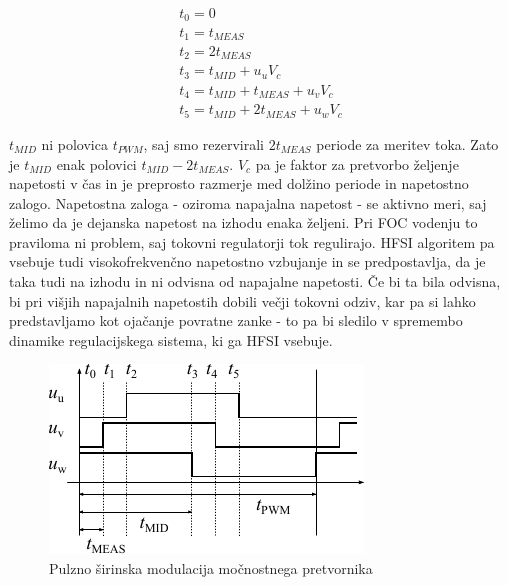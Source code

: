 \documentclass[a4paper,twoside,openright,12pt,slovene]{book}
\begin{document}
\begin{equation} \label{izracunPWM}
\begin{gathered}
    t_0 = 0  \\
    t_1 = t_{MEAS}  \\
    t_2 = 2t_{MEAS}  \\
    t_3 = t_{MID} + u_uV_c  \\
    t_4 = t_{MID} + t_{MEAS} + u_vV_c \\
    t_5 = t_{MID} + 2t_{MEAS} + u_wV_c
\end{gathered}
\end{equation}

$t_{MID}$ ni polovica $t_{PWM}$, saj smo rezervirali $2t_{MEAS}$ periode za meritev toka. Zato je $t_{MID}$ enak polovici $t_{MID} - 2t_{MEAS}$. $V_c$ pa je faktor za pretvorbo željenje napetosti v
čas in je preprosto razmerje med dolžino periode in napetostno zalogo. Napetostna zaloga - oziroma napajalna napetost - se aktivno meri, saj želimo da je dejanska napetost na izhodu enaka željeni. Pri
FOC vodenju to praviloma ni problem, saj tokovni regulatorji tok regulirajo. HFSI algoritem pa vsebuje tudi visokofrekvenčno napetostno vzbujanje in se predpostavlja, da je taka tudi na izhodu in ni
odvisna od napajalne napetosti. Če bi ta bila odvisna, bi pri višjih napajalnih napetostih dobili večji tokovni odziv, kar pa si lahko predstavljamo kot ojačanje povratne zanke - to pa bi sledilo v
spremembo dinamike regulacijskega sistema, ki ga HFSI vsebuje.

\begin{figure}[!htbp]
    \centering
    \includegraphics[width=1\columnwidth]{Slike/Inkscape/PWM.pdf}
    \caption{\label{PWM} Pulzno širinska modulacija močnostnega pretvornika }
\end{figure}
\end{document}
